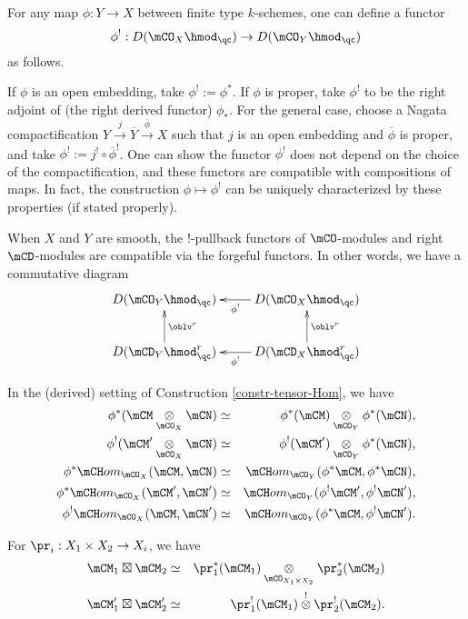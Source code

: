 	\begin{rem}
		For any map $\phi:Y\to X$ between finite type $k$-schemes, one can define a functor
		\[
			\phi^!: D(\mCO_X\hmod_\qc) \to D(\mCO_Y\hmod_\qc)
		\]
		as follows.

		If $\phi$ is an open embedding, take $\phi^!:=\phi^*$. If $\phi$ is proper, take $\phi^!$ to be the right adjoint of (the right derived functor) $\phi_*$. For the general case, choose a Nagata compactification $Y\xrightarrow{j}\overline{Y} \xrightarrow{\overline{\phi}} X$ such that $j$ is an open embedding and $\overline{\phi}$ is proper, and take $\phi^!:= j^! \circ \overline{\phi}^!$. One can show the functor $\phi^!$ does not depend on the choice of the compactification, and these functors are compatible with compositions of maps. In fact, the construction $\phi \mapsto \phi^!$ can be uniquely characterized by these properties (if stated properly).

		When $X$ and $Y$ are smooth, the $!$-pullback functors of $\mCO$-modules and right $\mCD$-modules are compatible via the forgeful functors. In other words, we have a commutative diagram
		\begin{equation}
			\label{eqn-pull-vs-oblv}
			\xymatrix{
				D(\mCO_Y\hmod_\qc) &
				D(\mCO_X\hmod_\qc)   \ar[l]^-{\phi^!} \\
				D(\mCD_Y\hmod^r_\qc)   \ar[u]_-{\oblv^r} &
				D(\mCD_X\hmod^r_\qc) \ar[l]^-{\phi^!} \ar[u]_-{\oblv^r}
			}
		\end{equation}
	\end{rem}

	\begin{facts}
		In the (derived) setting of Construction \ref{constr-tensor-Hom}, we have
		\begin{eqnarray*}
			\phi^*( \mCM\ot_{\mCO_X} \mCN ) &\simeq& \phi^*(\mCM) \ot_{\mCO_Y} \phi^*(\mCN) ,\\
			\phi^!( \mCM'\ot_{\mCO_X} \mCN ) &\simeq& \phi^!(\mCM') \ot_{\mCO_Y} \phi^*(\mCN) ,\\
			\phi^* \mCH om_{\mCO_X}(\mCM,\mCN ) &\simeq& \mCH om_{\mCO_Y}(\phi^*\mCM,\phi^*\mCN ), \\
			\phi^* \mCH om_{\mCO_X}(\mCM',\mCN' ) &\simeq& \mCH om_{\mCO_Y}(\phi^!\mCM',\phi^!\mCN' ),\\
			\phi^! \mCH om_{\mCO_X}(\mCM,\mCN' ) &\simeq& \mCH om_{\mCO_Y}(\phi^*\mCM,\phi^!\mCN' ).
		\end{eqnarray*}
	\end{facts}

	\begin{facts}
		For $\pr_i: X_1\mt X_2 \to X_i$, we have
		\begin{eqnarray*}
			\mCM_1 \boxt \mCM_2 &\simeq& \pr_1^*(\mCM_1) \ot_{\mCO_{X_1\mt X_2}} \pr_2^*(\mCM_2) \\
			\mCM_1' \boxt \mCM_2' &\simeq& \pr_1^!(\mCM_1) \ot^! \pr_2^!(\mCM_2).
		\end{eqnarray*}

	\end{facts}

